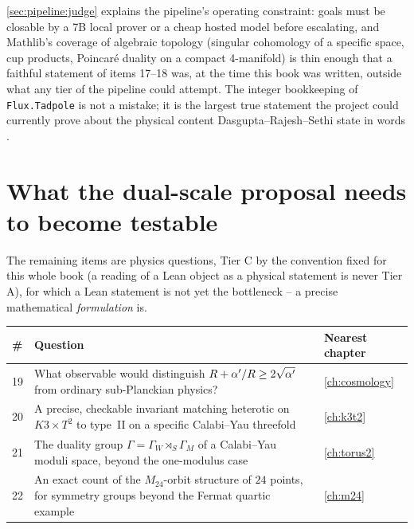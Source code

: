 \begin{historybox}
\cref{sec:pipeline:judge} explains the pipeline's operating constraint: goals must be
closable by a 7B local prover or a cheap hosted model before escalating, and Mathlib's
coverage of algebraic topology (singular cohomology of a specific space, cup products,
Poincar\'e duality on a compact 4-manifold) is thin enough that a faithful statement of
items 17--18 was, at the time this book was written, outside what any tier of the pipeline
could attempt. The integer bookkeeping of \texttt{Flux.Tadpole} is not a mistake; it is the
largest true statement the project could currently prove about the physical content
Dasgupta--Rajesh--Sethi state in words .
\end{historybox}

\section{What the dual-scale proposal needs to become testable}\label{sec:open:physics}

The remaining items are physics questions, Tier C by the convention fixed for this whole
book (a reading of a Lean object as a physical statement is never Tier A), for which a
Lean statement is not yet the bottleneck -- a precise mathematical \emph{formulation} is.

\begin{center}\small
\begin{tabular}{@{}p{0.6cm}p{7.9cm}p{2.9cm}@{}}\toprule
\# & Question & Nearest chapter \\ \midrule
19 & What observable would distinguish $R+\alpha'/R\ge2\sqrt{\alpha'}$ from ordinary sub-Planckian physics? & \cref{ch:cosmology} \\
20 & A precise, checkable invariant matching heterotic on $K3\times T^2$ to type~II on a specific Calabi--Yau threefold & \cref{ch:k3t2} \\
21 & The duality group $\Gamma=\Gamma_W\rtimes_S\Gamma_M$ of a Calabi--Yau moduli space, beyond the one-modulus case & \cref{ch:torus2} \\
22 & An exact count of the $M_{24}$-orbit structure of $24$ points, for symmetry groups beyond the Fermat quartic example & \cref{ch:m24} \\
\bottomrule\end{tabular}
\end{center}


